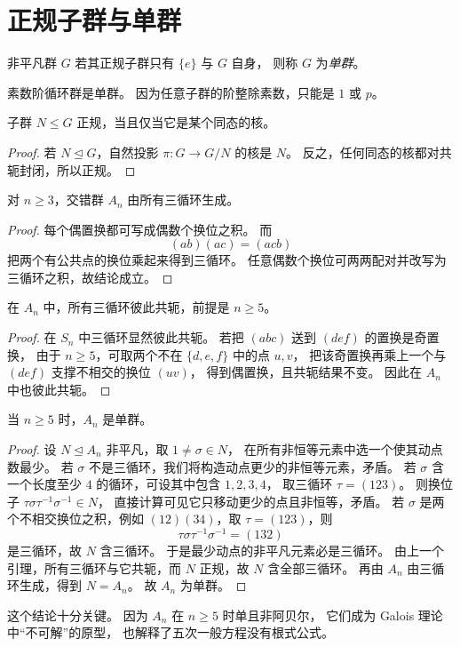 \section{正规子群与单群}
\begin{definition}
非平凡群 $G$ 若其正规子群只有 $\{e\}$ 与 $G$ 自身，
则称 $G$ 为\emph{单群}。
\end{definition}
\begin{example}
素数阶循环群是单群。
因为任意子群的阶整除素数，只能是 $1$ 或 $p$。
\end{example}
\begin{proposition}
子群 $N\le G$ 正规，当且仅当它是某个同态的核。
\end{proposition}
\begin{proof}
若 $N\trianglelefteq G$，自然投影 $\pi:G\to G/N$ 的核是 $N$。
反之，任何同态的核都对共轭封闭，所以正规。
\end{proof}
\begin{lemma}
对 $n\ge 3$，交错群 $A_n$ 由所有三循环生成。
\end{lemma}
\begin{proof}
每个偶置换都可写成偶数个换位之积。
而
\[
(ab)(ac)=(acb)
\]
把两个有公共点的换位乘起来得到三循环。
任意偶数个换位可两两配对并改写为三循环之积，故结论成立。
\end{proof}
\begin{lemma}
在 $A_n$ 中，所有三循环彼此共轭，前提是 $n\ge5$。
\end{lemma}
\begin{proof}
在 $S_n$ 中三循环显然彼此共轭。
若把 $(abc)$ 送到 $(def)$ 的置换是奇置换，
由于 $n\ge5$，可取两个不在 $\{d,e,f\}$ 中的点 $u,v$，
把该奇置换再乘上一个与 $(def)$ 支撑不相交的换位 $(uv)$，
得到偶置换，且共轭结果不变。
因此在 $A_n$ 中也彼此共轭。
\end{proof}
\begin{theorem}
当 $n\ge5$ 时，$A_n$ 是单群。
\end{theorem}
\begin{proof}
设 $N\trianglelefteq A_n$ 非平凡，取 $1\ne \sigma\in N$，
在所有非恒等元素中选一个使其动点数最少。
若 $\sigma$ 不是三循环，我们将构造动点更少的非恒等元素，矛盾。
若 $\sigma$ 含一个长度至少 $4$ 的循环，可设其中包含 $1,2,3,4$，
取三循环 $\tau=(123)$。
则换位子 $\tau\sigma\tau^{-1}\sigma^{-1}\in N$，
直接计算可见它只移动更少的点且非恒等，矛盾。
若 $\sigma$ 是两个不相交换位之积，例如 $(12)(34)$，取 $\tau=(123)$，则
\[
\tau\sigma\tau^{-1}\sigma^{-1}=(132)
\]
是三循环，故 $N$ 含三循环。
于是最少动点的非平凡元素必是三循环。
由上一个引理，所有三循环与它共轭，而 $N$ 正规，故 $N$ 含全部三循环。
再由 $A_n$ 由三循环生成，得到 $N=A_n$。
故 $A_n$ 为单群。
\end{proof}
\begin{remark}
这个结论十分关键。
因为 $A_n$ 在 $n\ge5$ 时单且非阿贝尔，
它们成为 Galois 理论中“不可解”的原型，
也解释了五次一般方程没有根式公式。
\end{remark}
